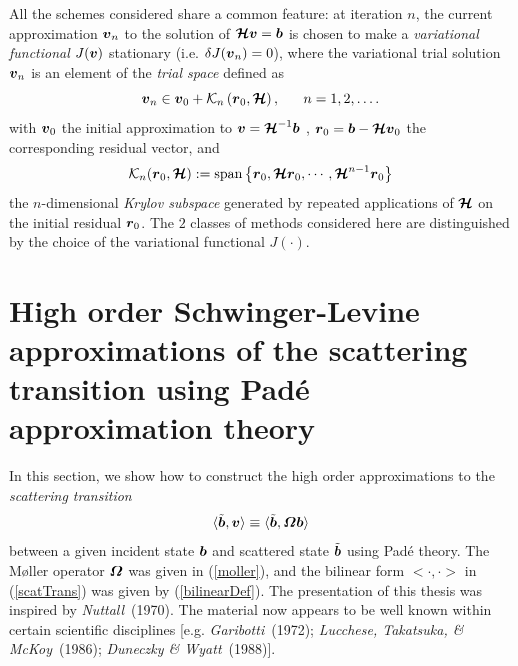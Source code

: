 All the schemes considered share a common feature:\newline
at iteration $n$, the current approximation ${\mbox{\boldmath$\mit v$\unboldmath}}_{n}$ to the 
solution 
of ${\mbox{\boldmath$\cal H$\unboldmath}} {\mbox{\boldmath$\mit v$\unboldmath}}= {{\mbox{\boldmath$\mit  b$\unboldmath}}} $
is chosen to make a {\em variational functional\/} $J({\mbox{\boldmath$\mit v$\unboldmath}} )$ 
stationary 
(i.e. $\delta J({\mbox{\boldmath$\mit v$\unboldmath}}_{n} )=0$), where the variational trial 
solution ${\mbox{\boldmath$\mit v$\unboldmath}}_{n}$ is an element of the {\em trial space\/} defined 
as
\begin{equation} \label{krylov}
{\bmi  v }_{n} \in  {\bmi  v}_{0} 
+{\cal K}_{n}\left({\bmi  r}_{0},{\CB H}\right) ,\ \ \ \ \ n=1,2,\ldots  .
\end{equation}
with ${\mbox{\boldmath$\mit v$\unboldmath}}_{0}$ the initial approximation to 
$  {\mbox{\boldmath$\mit v$\unboldmath}}= {\mbox{\boldmath$\cal H$\unboldmath}}^{-1}{{\mbox{\boldmath$\mit  b$\unboldmath}}} $ , 
${\mbox{\boldmath$\mit r$\unboldmath}}_{0}= {{\mbox{\boldmath$\mit  b$\unboldmath}}}- {\mbox{\boldmath$\cal H$\unboldmath}}{\mbox{\boldmath$\mit v$\unboldmath}}_{0}$ 
the corresponding residual vector, and 
\begin{equation} 	\label{Krylovdef}
	{\cal K}_{n}({\mbox{\boldmath$\mit r$\unboldmath}}_{0},{\mbox{\boldmath$\cal H$\unboldmath}}):= \mbox {span}\left\{{{\mbox{\boldmath$\mit r$\unboldmath}}_{0},{\mbox{\boldmath$\cal H$\unboldmath}}{\mbox{\boldmath$\mit r$\unboldmath}}_{0},
	\cdots ,{\mbox{\boldmath$\cal H$\unboldmath}}^{n-1}{\mbox{\boldmath$\mit r$\unboldmath}}_{0}}\right\}
\end{equation}
the $n$-dimensional {\em Krylov subspace\/} generated by repeated 
applications of ${\mbox{\boldmath$\cal H$\unboldmath}}$ on the initial residual ${\mbox{\boldmath$\mit r$\unboldmath}}_{0}$. 
The $2$ classes of methods considered here are distinguished by the choice 
of the
variational functional $J(\cdot)$.




\section [High order Schwinger-Levine approximations]
{High order Schwinger-Levine approximations of the scattering 
transition using Pad\'{e} approximation theory} \label{sectionpade}

In this section, we show how to construct the high order approximations
to the {\em scattering transition\/}
\begin{equation} \label{scatTrans}
\langle \tilde{\mbox{\boldmath$\mit b$\unboldmath}}, {\mbox{\boldmath$\mit v$\unboldmath}}\rangle
\equiv
\langle \tilde{\mbox{\boldmath$\mit b$\unboldmath}}, {\mbox{\boldmath$\mit \Omega$\unboldmath}} {\mbox{\boldmath$\mit b$\unboldmath}}\rangle 
\end{equation}
between a given incident state ${\mbox{\boldmath$\mit b$\unboldmath}}$ and scattered state 
$\tilde{\mbox{\boldmath$\mit b$\unboldmath}}$
using Pad\'{e} theory. The  M{\o}ller operator ${\mbox{\boldmath$\mit \Omega$\unboldmath}}$ was given 
in 
(\ref{moller}), and the bilinear form $<\cdot,\cdot>$ in
(\ref{scatTrans}) was given  by (\ref{bilinearDef}). The presentation of 
this thesis was inspired by {\em Nuttall\/}~(1970). The material 
now appears to be well known within certain scientific disciplines 
[e.g. {\em Garibotti\/}~(1972); {\em Lucchese, Takatsuka, \& 
McKoy\/}~(1986); {\em Duneczky \& Wyatt\/}~(1988)].

